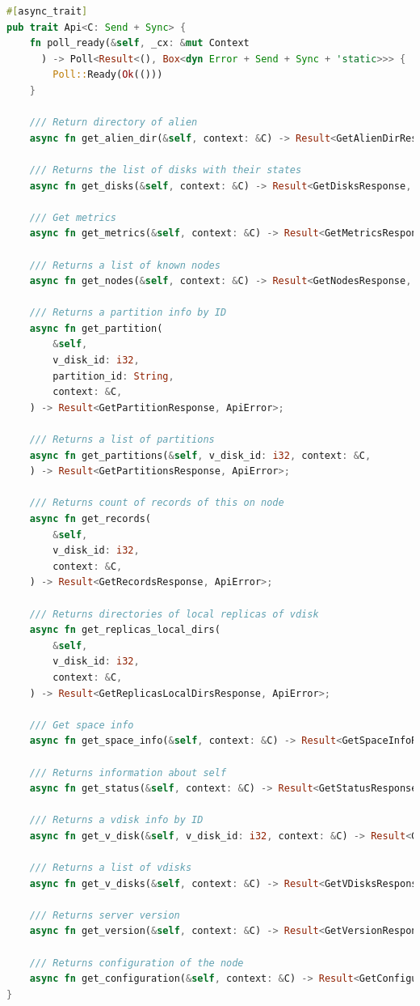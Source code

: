 \begin{lstlisting}[label=lst:api, caption={Трейт API}, language=Rust]
#[async_trait]
pub trait Api<C: Send + Sync> {
    fn poll_ready(&self, _cx: &mut Context
      ) -> Poll<Result<(), Box<dyn Error + Send + Sync + 'static>>> {
        Poll::Ready(Ok(()))
    }

    /// Return directory of alien
    async fn get_alien_dir(&self, context: &C) -> Result<GetAlienDirResponse, ApiError>;

    /// Returns the list of disks with their states
    async fn get_disks(&self, context: &C) -> Result<GetDisksResponse, ApiError>;

    /// Get metrics
    async fn get_metrics(&self, context: &C) -> Result<GetMetricsResponse, ApiError>;

    /// Returns a list of known nodes
    async fn get_nodes(&self, context: &C) -> Result<GetNodesResponse, ApiError>;

    /// Returns a partition info by ID
    async fn get_partition(
        &self,
        v_disk_id: i32,
        partition_id: String,
        context: &C,
    ) -> Result<GetPartitionResponse, ApiError>;

    /// Returns a list of partitions
    async fn get_partitions(&self, v_disk_id: i32, context: &C,
    ) -> Result<GetPartitionsResponse, ApiError>;

    /// Returns count of records of this on node
    async fn get_records(
        &self,
        v_disk_id: i32,
        context: &C,
    ) -> Result<GetRecordsResponse, ApiError>;

    /// Returns directories of local replicas of vdisk
    async fn get_replicas_local_dirs(
        &self,
        v_disk_id: i32,
        context: &C,
    ) -> Result<GetReplicasLocalDirsResponse, ApiError>;

    /// Get space info
    async fn get_space_info(&self, context: &C) -> Result<GetSpaceInfoResponse, ApiError>;

    /// Returns information about self
    async fn get_status(&self, context: &C) -> Result<GetStatusResponse, ApiError>;

    /// Returns a vdisk info by ID
    async fn get_v_disk(&self, v_disk_id: i32, context: &C) -> Result<GetVDiskResponse, ApiError>;

    /// Returns a list of vdisks
    async fn get_v_disks(&self, context: &C) -> Result<GetVDisksResponse, ApiError>;

    /// Returns server version
    async fn get_version(&self, context: &C) -> Result<GetVersionResponse, ApiError>;

    /// Returns configuration of the node
    async fn get_configuration(&self, context: &C) -> Result<GetConfigurationResponse, ApiError>;
}
\end{lstlisting}

